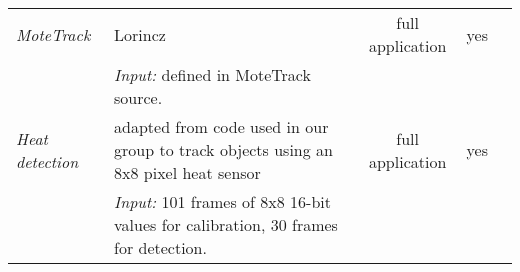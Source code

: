 \begin{table}
{\begin{tabular}{lp{}ccc}
    \emph{MoteTrack}         & Lorincz \cite{Lorincz:2006fc, motetrack}                                                                   & full application & yes            & \\
                             & \emph{Input:} defined in MoteTrack source.                                                                 &                  &                & \\
    \emph{Heat detection}    & adapted from code used in our group to track objects using an 8x8 pixel heat sensor                        & full application & yes            & \\
                             & \emph{Input:} 101 frames of 8x8 16-bit values for calibration, 30 frames for detection.                    &                  &                & \\
    \bottomrule
    \end{tabular}
    }
\end{table}


